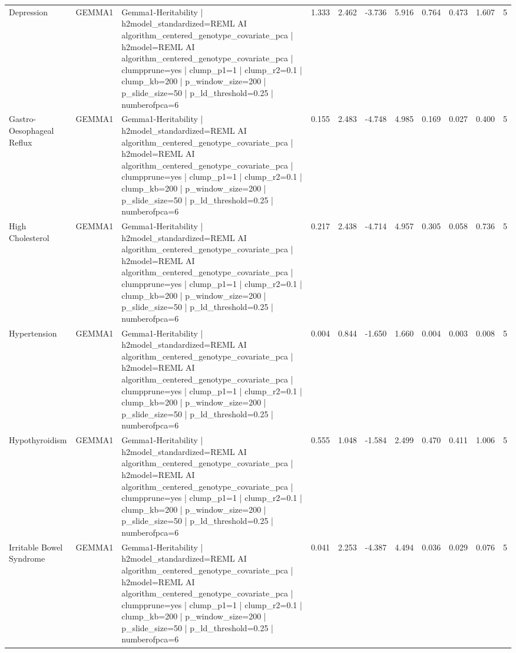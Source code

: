 \begin{landscape}
\begin{longtable}{p{2.4cm}p{1.8cm}p{6.0cm}rrrrrrrr}
Depression & GEMMA1 & Gemma1-Heritability | h2model\_standardized=REML AI algorithm\_centered\_genotype\_covariate\_pca | h2model=REML AI algorithm\_centered\_genotype\_covariate\_pca | clumpprune=yes | clump\_p1=1 | clump\_r2=0.1 | clump\_kb=200 | p\_window\_size=200 | p\_slide\_size=50 | p\_ld\_threshold=0.25 | numberofpca=6 & 1.333 & 2.462 & -3.736 & 5.916 & 0.764 & 0.473 & 1.607 & 5 \\
Gastro-Oesophageal Reflux & GEMMA1 & Gemma1-Heritability | h2model\_standardized=REML AI algorithm\_centered\_genotype\_covariate\_pca | h2model=REML AI algorithm\_centered\_genotype\_covariate\_pca | clumpprune=yes | clump\_p1=1 | clump\_r2=0.1 | clump\_kb=200 | p\_window\_size=200 | p\_slide\_size=50 | p\_ld\_threshold=0.25 | numberofpca=6 & 0.155 & 2.483 & -4.748 & 4.985 & 0.169 & 0.027 & 0.400 & 5 \\
High Cholesterol & GEMMA1 & Gemma1-Heritability | h2model\_standardized=REML AI algorithm\_centered\_genotype\_covariate\_pca | h2model=REML AI algorithm\_centered\_genotype\_covariate\_pca | clumpprune=yes | clump\_p1=1 | clump\_r2=0.1 | clump\_kb=200 | p\_window\_size=200 | p\_slide\_size=50 | p\_ld\_threshold=0.25 | numberofpca=6 & 0.217 & 2.438 & -4.714 & 4.957 & 0.305 & 0.058 & 0.736 & 5 \\
Hypertension & GEMMA1 & Gemma1-Heritability | h2model\_standardized=REML AI algorithm\_centered\_genotype\_covariate\_pca | h2model=REML AI algorithm\_centered\_genotype\_covariate\_pca | clumpprune=yes | clump\_p1=1 | clump\_r2=0.1 | clump\_kb=200 | p\_window\_size=200 | p\_slide\_size=50 | p\_ld\_threshold=0.25 | numberofpca=6 & 0.004 & 0.844 & -1.650 & 1.660 & 0.004 & 0.003 & 0.008 & 5 \\
Hypothyroidism & GEMMA1 & Gemma1-Heritability | h2model\_standardized=REML AI algorithm\_centered\_genotype\_covariate\_pca | h2model=REML AI algorithm\_centered\_genotype\_covariate\_pca | clumpprune=yes | clump\_p1=1 | clump\_r2=0.1 | clump\_kb=200 | p\_window\_size=200 | p\_slide\_size=50 | p\_ld\_threshold=0.25 | numberofpca=6 & 0.555 & 1.048 & -1.584 & 2.499 & 0.470 & 0.411 & 1.006 & 5 \\
Irritable Bowel Syndrome & GEMMA1 & Gemma1-Heritability | h2model\_standardized=REML AI algorithm\_centered\_genotype\_covariate\_pca | h2model=REML AI algorithm\_centered\_genotype\_covariate\_pca | clumpprune=yes | clump\_p1=1 | clump\_r2=0.1 | clump\_kb=200 | p\_window\_size=200 | p\_slide\_size=50 | p\_ld\_threshold=0.25 | numberofpca=6 & 0.041 & 2.253 & -4.387 & 4.494 & 0.036 & 0.029 & 0.076 & 5 \\

\end{longtable}
\end{landscape}
